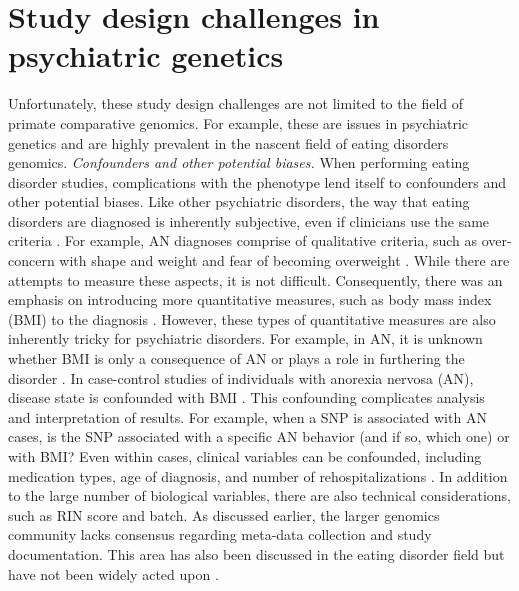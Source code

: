 \section{Study design challenges in psychiatric genetics}
Unfortunately, these study design challenges are not limited to the field of primate comparative genomics. For example, these are issues in psychiatric genetics and are highly prevalent in the nascent field of eating disorders genomics. 
\textit{Confounders and other potential biases.} When performing eating disorder studies, complications with the phenotype lend itself to confounders and other potential biases. Like other psychiatric disorders, the way that eating disorders are diagnosed is inherently subjective, even if clinicians use the same criteria \cite{RN2643, RN2461}. For example, AN diagnoses comprise of qualitative criteria, such as over-concern with shape and weight and fear of becoming overweight \cite{RN2668}. While there are attempts to measure these aspects, it is not difficult. Consequently, there was an emphasis on introducing more quantitative measures, such as body mass index (BMI) to the diagnosis \cite{RN4372}. However, these types of quantitative measures are also inherently tricky for psychiatric disorders. For example, in AN, it is unknown whether BMI is only a consequence of AN or plays a role in furthering the disorder \cite{RN4372}. In case-control studies of individuals with anorexia nervosa (AN), disease state is confounded with BMI \cite{RN1166, RN4568}. This confounding complicates analysis and interpretation of results. For example, when a SNP is associated with AN cases, is the SNP associated with a specific AN behavior (and if so, which one) or with BMI? 
Even within cases, clinical variables can be confounded, including medication types, age of diagnosis, and number of rehospitalizations \cite{RN1411}. In addition to the large number of biological variables, there are also technical considerations, such as RIN score and batch. As discussed earlier, the larger genomics community lacks consensus regarding meta-data collection and study documentation. This area has also been discussed in the eating disorder field but have not been widely acted upon \cite{RN4569}. 

